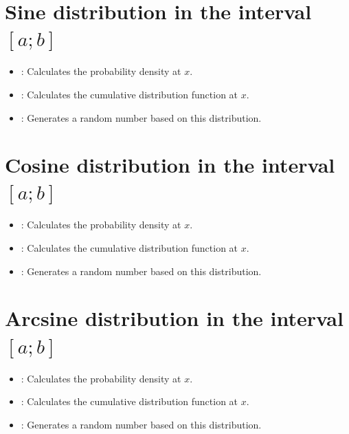 \section{Sine distribution in the interval \texorpdfstring{$[a;b]$}{[a;b]}}

\begin{itemize}

\item
{}:
Calculates the probability density at $x$.

\item
{}:
Calculates the cumulative distribution function at $x$.

\item
{}:
Generates a random number based on this distribution.

\end{itemize}



\section{Cosine distribution in the interval \texorpdfstring{$[a;b]$}{[a;b]}}

\begin{itemize}

\item
{}:
Calculates the probability density at $x$.

\item
{}:
Calculates the cumulative distribution function at $x$.

\item
{}:
Generates a random number based on this distribution.

\end{itemize}



\section{Arcsine distribution in the interval \texorpdfstring{$[a;b]$}{[a;b]}}

\begin{itemize}

\item
{}:
Calculates the probability density at $x$.

\item
{}:
Calculates the cumulative distribution function at $x$.

\item
{}:
Generates a random number based on this distribution.

\end{itemize}



